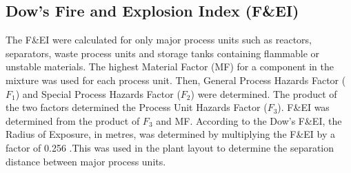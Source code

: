 \subsection{Dow's Fire and Explosion Index (F\&EI)}
The F\&EI were calculated for only major process units such as reactors, separators, waste process units and storage tanks containing flammable or unstable materials. The highest Material Factor (MF) for a component in the mixture was used for each process unit. Then, General Process Hazards Factor ($F_1$) and Special Process Hazards Factor ($F_2$) were determined. The product of the two factors determined the Process Unit Hazards Factor ($F_3$). F\&EI was determined from the product of $F_3$ and MF. According to the Dow's F\&EI, the Radius of Exposure, in metres, was determined by multiplying the F\&EI by a factor of 0.256 \cite{aiche_dows_1994}.This was used in the plant layout to determine the separation distance between major process units.    

